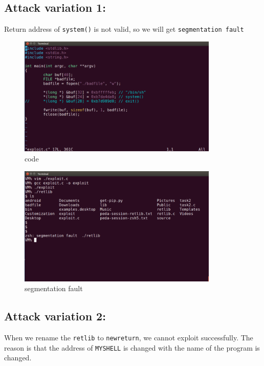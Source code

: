 \documentclass[onecolumn,oneside]{SUSTechHomework}
\begin{document}
  \subsection*{Attack variation 1:}

  Return address of \verb|system()| is not valid, so we will get \verb|segmentation fault|

  \begin{figure}[H]
    \centering
    \includegraphics[width=0.85\textwidth]{img/task3_6.png}
    \caption{code}
  \end{figure}

  \begin{figure}[H]
    \centering
    \includegraphics[width=0.85\textwidth]{img/task3_5.png}
    \caption{segmentation fault}
  \end{figure}

  \subsection*{Attack variation 2:}

  When we rename the \verb|retlib| to \verb|newreturn|, we cannot exploit successfully. The reason is that the address of \verb|MYSHELL| is changed with the name of the program is changed.
\end{document}
